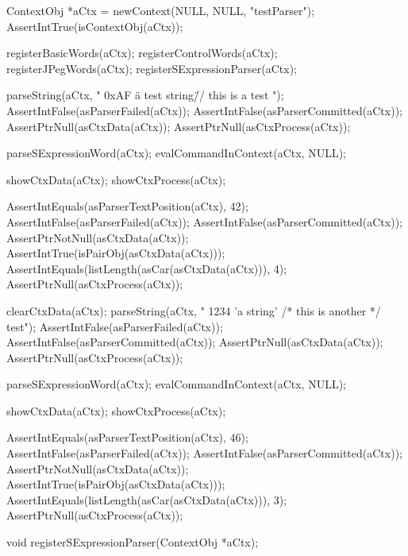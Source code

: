 \startCTest
  ContextObj *aCtx = newContext(NULL, NULL, "testParser");
  AssertIntTrue(isContextObj(aCtx));
  
  registerBasicWords(aCtx);
  registerControlWords(aCtx);
  registerJPegWords(aCtx);
  registerSExpressionParser(aCtx);
  
  parseString(aCtx, " 0xAF \"a test string\" // this is \n a test ");
  AssertIntFalse(asParserFailed(aCtx));
  AssertIntFalse(asParserCommitted(aCtx));
  AssertPtrNull(asCtxData(aCtx));
  AssertPtrNull(asCtxProcess(aCtx));
  
  parseSExpressionWord(aCtx);
  evalCommandInContext(aCtx, NULL);
  
  showCtxData(aCtx);
  showCtxProcess(aCtx);
  
  AssertIntEquals(asParserTextPosition(aCtx), 42);
  AssertIntFalse(asParserFailed(aCtx));
  AssertIntFalse(asParserCommitted(aCtx));
  AssertPtrNotNull(asCtxData(aCtx));
  AssertIntTrue(isPairObj(asCtxData(aCtx)));
  AssertIntEquals(listLength(asCar(asCtxData(aCtx))), 4);
  AssertPtrNull(asCtxProcess(aCtx));
  
  clearCtxData(aCtx);
  parseString(aCtx, " 1234 'a string' /* this is \n another  */ test");
  AssertIntFalse(asParserFailed(aCtx));
  AssertIntFalse(asParserCommitted(aCtx));
  AssertPtrNull(asCtxData(aCtx));
  AssertPtrNull(asCtxProcess(aCtx));
  
  parseSExpressionWord(aCtx);
  evalCommandInContext(aCtx, NULL);

  showCtxData(aCtx);
  showCtxProcess(aCtx);
  
  AssertIntEquals(asParserTextPosition(aCtx), 46);
  AssertIntFalse(asParserFailed(aCtx));
  AssertIntFalse(asParserCommitted(aCtx));
  AssertPtrNotNull(asCtxData(aCtx));
  AssertIntTrue(isPairObj(asCtxData(aCtx)));
  AssertIntEquals(listLength(asCar(asCtxData(aCtx))), 3);
  AssertPtrNull(asCtxProcess(aCtx));
\stopCTest
\stopTestCase
\stopTestSuite

\startCHeader
void registerSExpressionParser(ContextObj *aCtx);
\stopCHeader

